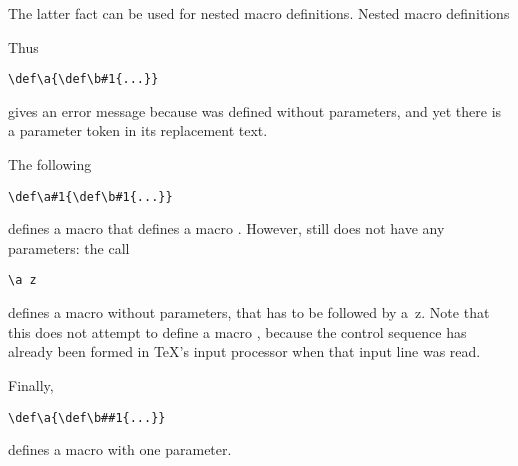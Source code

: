 The latter fact can be used for nested macro definitions.
\label{nest:def}\howto Nested macro definitions\par
Thus
\begin{verbatim}
\def\a{\def\b#1{...}}
\end{verbatim}
gives an error message
because  was defined without parameters, and
yet there is a parameter token in its replacement text.

The following
\begin{verbatim}
\def\a#1{\def\b#1{...}}
\end{verbatim}
defines a macro  that
defines a macro . However,  still does not
have any parameters: the call
\begin{verbatim}
\a z
\end{verbatim}
defines a macro  without parameters,
that has to be followed by a~\n z.
Note that this
does not attempt to define a macro , because the
control sequence  has already been formed in \TeX's
input processor when that input line was read.

Finally,
\begin{verbatim}
\def\a{\def\b##1{...}}
\end{verbatim}
defines a macro  
with one parameter.

